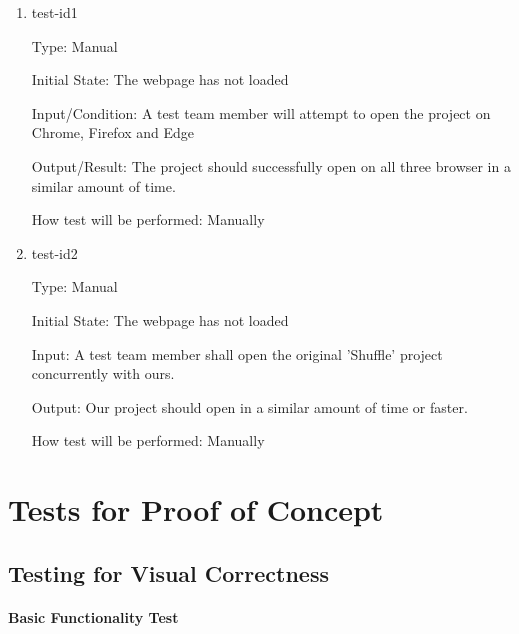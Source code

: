 \documentclass[12pt, titlepage]{article}
\begin{document}
\begin{enumerate}

\item{test-id1\\}

Type: Manual
					
Initial State: The webpage has not loaded
					
Input/Condition: A test team member will attempt to open the project on Chrome, Firefox and Edge
					
Output/Result: The project should successfully open on all three browser in a similar amount of time.
					
How test will be performed: Manually
					
\item{test-id2\\}

Type: Manual
					
Initial State: The webpage has not loaded
					
Input: A test team member shall open the original 'Shuffle' project concurrently with ours.
					
Output: Our project should open in a similar amount of time or faster.
					
How test will be performed: Manually

\end{enumerate}


\section{Tests for Proof of Concept}

\subsection{Testing for Visual Correctness}
		
\paragraph{Basic Functionality Test}
\end{document}
